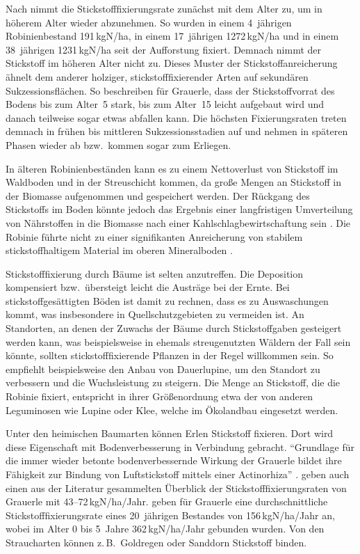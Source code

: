 \documentclass[twocolumn]{scrartcl}
\begin{document}
Nach \citet{boring1984robinie} nimmt die Stickstofffixierungsrate zunächst mit dem Alter zu, um in höherem Alter wieder abzunehmen. So wurden in einem 4~jährigen Robinienbestand 191\,kgN/ha, in einem 17~jährigen 1272\,kgN/ha und in einem 38~jährigen 1231\,kgN/ha seit der Aufforstung fixiert. Demnach nimmt der Stickstoff im höheren Alter nicht zu. Dieses Muster der Stickstoffanreicherung ähnelt dem anderer holziger, stickstofffixierender Arten auf sekundären Sukzessionsflächen.
So beschreiben \citet{cleve1971grauerle} für Grauerle, dass der Stickstoffvorrat des Bodens bis zum Alter~5 stark, bis zum Alter~15 leicht aufgebaut wird und danach teilweise sogar etwas abfallen kann. Die höchsten Fixierungsraten treten demnach in frühen bis mittleren Sukzessionsstadien auf und nehmen in späteren Phasen wieder ab bzw.\ kommen sogar zum Erliegen.

In älteren Robinienbeständen kann es zu einem Nettoverlust von Stickstoff im Waldboden und in der Streuschicht kommen, da große Mengen an Stickstoff in der Biomasse aufgenommen und gespeichert werden. Der Rückgang des Stickstoffs im Boden könnte jedoch das Ergebnis einer langfristigen Umverteilung von Nährstoffen in die Biomasse nach einer Kahlschlagbewirtschaftung sein \citep{boring1984robinie}.
Die Robinie führte nicht zu einer signifikanten Anreicherung von stabilem stickstoffhaltigem Material im oberen Mineralboden \citep{auten1945robinieN}.

Stickstofffixierung durch Bäume ist selten anzutreffen. Die Deposition kompensiert bzw.\ übersteigt leicht die Austräge bei der Ernte. Bei stickstoffgesättigten Böden ist damit zu rechnen, dass es zu Auswaschungen kommt, was insbesondere in Quellschutzgebieten zu vermeiden ist. An Standorten, an denen der Zuwachs der Bäume durch Stickstoffgaben gesteigert werden kann, was beispielsweise in ehemals streugenutzten Wäldern der Fall sein könnte, sollten stickstofffixierende Pflanzen in der Regel willkommen sein. So empfiehlt beispielsweise \citet{wiedemann1951ertragskunde} den Anbau von Dauerlupine, um den Standort zu verbessern und die Wuchsleistung zu steigern. Die Menge an Stickstoff, die die Robinie fixiert, entspricht in ihrer Größenordnung etwa der von anderen Leguminosen wie Lupine oder Klee, welche im Ökolandbau eingesetzt werden.

Unter den heimischen Baumarten können Erlen Stickstoff fixieren. Dort wird diese Eigenschaft mit Bodenverbesserung in Verbindung gebracht. \enquote{Grundlage für die immer wieder betonte bodenverbessernde Wirkung der Grauerle bildet ihre Fähigkeit zur Bindung von Luftstickstoff mittels einer Actinorhiza} \citep{schuett2014alnusIncarna}.
\citet{schuett2014alnusIncarna} geben auch einen aus der Literatur gesammelten Überblick der Stickstofffixierungsraten von Grauerle mit 43--72\,kgN/ha/Jahr.
\citet{cleve1971grauerle} geben für Grauerle eine durchschnittliche Stickstofffixierungsrate eines 20~jährigen Bestandes von 156\,kgN/ha/Jahr an, wobei im Alter 0 bis 5~Jahre 362\,kgN/ha/Jahr gebunden wurden.
Von den Straucharten können z.\,B.\ Goldregen oder Sanddorn Stickstoff binden.
\end{document}
